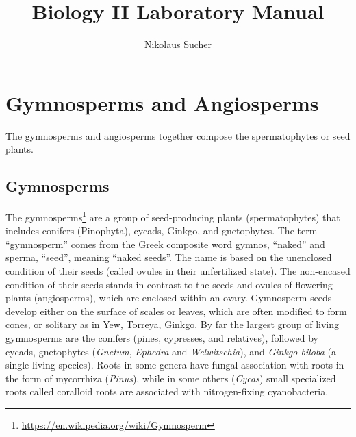 \documentclass[]{book}
\title{Biology II Laboratory Manual}
\author{Nikolaus Sucher}
\date{}
\let\rmarkdownfootnote\footnote%
\def\footnote{\protect\rmarkdownfootnote}
\renewcommand{\href}[2]{#2\footnote{\url{#1}}}
\theoremstyle{definition}
\theoremstyle{definition}
\theoremstyle{definition}
\theoremstyle{remark}
\begin{document}
\maketitle

{
\setcounter{tocdepth}{1}
\tableofcontents
}
\listoftables
\listoffigures


\twocolumn

\chapter{Gymnosperms and Angiosperms}\label{gymnosperms-and-angiosperms}

The gymnosperms and angiosperms together compose the spermatophytes or
seed plants.

\section{Gymnosperms}\label{gymnosperms}

The \href{https://en.wikipedia.org/wiki/Gymnosperm}{gymnosperms} are a
group of seed-producing plants (spermatophytes) that includes conifers
(Pinophyta), cycads, Ginkgo, and gnetophytes. The term ``gymnosperm''
comes from the Greek composite word gymnos, ``naked'' and sperma,
``seed'', meaning ``naked seeds''. The name is based on the unenclosed
condition of their seeds (called ovules in their unfertilized state).
The non-encased condition of their seeds stands in contrast to the seeds
and ovules of flowering plants (angiosperms), which are enclosed within
an ovary. Gymnosperm seeds develop either on the surface of scales or
leaves, which are often modified to form cones, or solitary as in Yew,
Torreya, Ginkgo. By far the largest group of living gymnosperms are the
conifers (pines, cypresses, and relatives), followed by cycads,
gnetophytes (\emph{Gnetum}, \emph{Ephedra} and \emph{Welwitschia}), and \emph{Ginkgo biloba} (a
single living species). Roots in some genera have fungal association
with roots in the form of mycorrhiza (\emph{Pinus}), while in some others
(\emph{Cycas}) small specialized roots called coralloid roots are associated
with nitrogen-fixing cyanobacteria.
\end{document}
